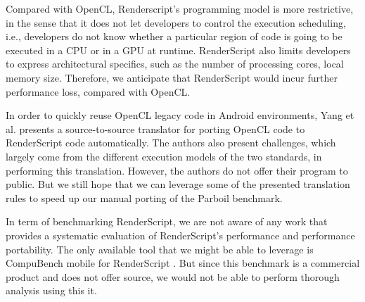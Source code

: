 Compared with OpenCL, Renderscript's programming model is more restrictive, in
the sense that it does not let developers to control the execution scheduling,
i.e., developers do not know whether a particular region of code is going to be
executed in a CPU or in a GPU at runtime. RenderScript also limits developers to
express architectural specifics, such as the number of processing cores, local
memory size. Therefore, we anticipate that RenderScript would incur further
performance loss, compared with OpenCL.

In order to quickly reuse OpenCL legacy code in Android environments, Yang et al.
\cite{yang2012o2render} presents a source-to-source translator for porting OpenCL
code to RenderScript code automatically. The authors also present challenges,
which largely come from the different execution models of the two standards, in
performing this translation.  However, the authors do not offer their program to
public. But we still hope that we can leverage some of the presented translation rules
to speed up our manual porting of the Parboil benchmark.

In term of benchmarking RenderScript, we are not aware of any work that provides
a systematic evaluation of RenderScript's performance and performance
portability. The only available tool that we might be able to leverage is
CompuBench mobile for RenderScript \cite{compuBenchMobile}. But since this benchmark
is a commercial product and does not offer source, we would not be able to
perform thorough analysis using this it.
